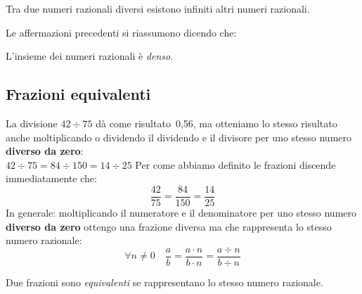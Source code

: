 \begin{corollario}
 Tra due numeri razionali diversi esistono infiniti altri numeri razionali.
\end{corollario}

Le affermazioni precedenti si riassumono dicendo che:

\begin{definizione}
 L'insieme dei numeri razionali è \emph{denso}.
\end{definizione}

\subsection{Frazioni equivalenti}
\label{sub:razionali_equivalenti}

La divisione \(42 \div 75 \) dà come risultato~0,56, ma otteniamo lo stesso 
risultato anche moltiplicando o dividendo il dividendo e il divisore per 
uno stesso numero \textbf{diverso da zero}:\\
\(42 \div 75 = 84 \div 150 = 14 \div 25\)
Per come abbiamo definito le frazioni discende immediatamente che:\\
\[\dfrac{42}{75} = \dfrac{84}{150} = \dfrac{14}{25}\]
In generale: moltiplicando il numeratore e il denominatore per uno stesso 
numero \textbf{diverso da zero} ottengo una frazione diversa ma che 
rappresenta lo stesso numero razionale:
\[\forall n \neq 0 \quad \frac{a}{b} = \frac{a \cdot n}{b \cdot n} =
  \frac{a \div n}{b \div n}\]

\begin{definizione}
 Due frazioni sono \emph{equivalenti} se rappresentano lo stesso numero 
razionale.
\end{definizione}

